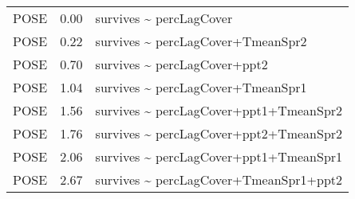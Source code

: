 \documentclass[10pt]{article}
\begin{document}
\begin{table}[ht]
\begin{tabularx}{\textwidth}{llZ}
  POSE & 0.00 & survives \~{} percLagCover \\ 
  POSE & 0.22 & survives \~{} percLagCover+TmeanSpr2 \\ 
  POSE & 0.70 & survives \~{} percLagCover+ppt2 \\ 
  POSE & 1.04 & survives \~{} percLagCover+TmeanSpr1 \\ 
  POSE & 1.56 & survives \~{} percLagCover+ppt1+TmeanSpr2 \\ 
  POSE & 1.76 & survives \~{} percLagCover+ppt2+TmeanSpr2 \\ 
  POSE & 2.06 & survives \~{} percLagCover+ppt1+TmeanSpr1 \\ 
  POSE & 2.67 & survives \~{} percLagCover+TmeanSpr1+ppt2 \\ 
   \hline
\end{tabularx}
\end{table}
\end{document}
